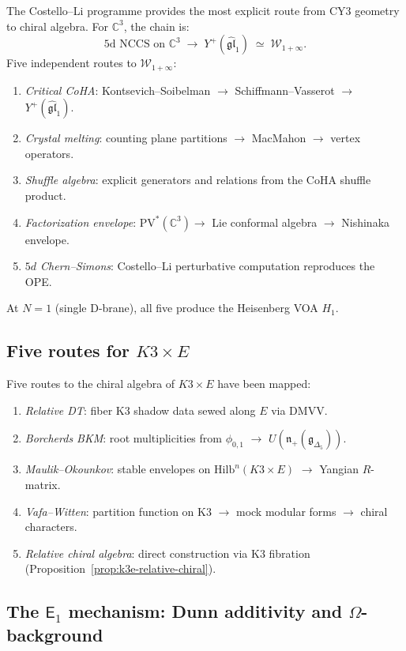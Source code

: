 \documentclass[11pt]{article}
\newcommand{\cW}{\mathcal{W}}
\newcommand{\fg}{\mathfrak{g}}
\newcommand{\fn}{\mathfrak{n}}
\newcommand{\fgl}{\mathfrak{gl}}
\newcommand{\C}{\mathbb{C}}
\newcommand{\Eone}{\mathsf{E}_1}
\begin{document}
The Costello--Li programme provides the most explicit route from CY3 geometry to chiral algebra. For $\C^3$, the chain is:
\[
 \text{5d NCCS on } \C^3 \;\to\; Y^+(\widehat{\fgl}_1) \;\simeq\; \cW_{1+\infty}.
\]
Five independent routes to $\cW_{1+\infty}$:
\begin{enumerate}[label=\textup{(\alph*)}]
 \item \emph{Critical CoHA}: Kontsevich--Soibelman $\to$ Schiffmann--Vasserot $\to$ $Y^+(\widehat{\fgl}_1)$.
 \item \emph{Crystal melting}: counting plane partitions $\to$ MacMahon $\to$ vertex operators.
 \item \emph{Shuffle algebra}: explicit generators and relations from the CoHA shuffle product.
 \item \emph{Factorization envelope}: $\mathrm{PV}^*(\C^3) \to$ Lie conformal algebra $\to$ Nishinaka envelope.
 \item \emph{$5d$ Chern--Simons}: Costello--Li perturbative computation reproduces the OPE.
\end{enumerate}
At $N = 1$ (single D-brane), all five produce the Heisenberg VOA $H_1$.

\subsection{Five routes for $K3 \times E$}
\label{subsec:five-routes-k3e}

Five routes to the chiral algebra of $K3 \times E$ have been mapped:
\begin{enumerate}[label=\textup{(\alph*)}]
 \item \emph{Relative DT}: fiber K3 shadow data sewed along $E$ via DMVV.
 \item \emph{Borcherds BKM}: root multiplicities from $\phi_{0,1}$ $\to$ $U(\fn_+(\fg_{\Delta_5}))$.
 \item \emph{Maulik--Okounkov}: stable envelopes on $\mathrm{Hilb}^n(K3 \times E)$ $\to$ Yangian $R$-matrix.
 \item \emph{Vafa--Witten}: partition function on K3 $\to$ mock modular forms $\to$ chiral characters.
 \item \emph{Relative chiral algebra}: direct construction via K3 fibration (Proposition~\ref{prop:k3e-relative-chiral}).
\end{enumerate}

\subsection{The $\Eone$ mechanism: Dunn additivity and $\Omega$-background}
\label{subsec:e1-mechanism}
\end{document}
